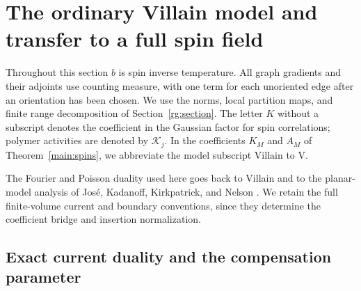 \section{The ordinary Villain model and transfer to a full spin field}
\label{vi:section}

Throughout this section $b$ is spin inverse temperature.  All graph
gradients and their adjoints use counting measure, with one term for each
unoriented edge after an orientation has been chosen.  We use the norms,
local partition maps, and finite range decomposition of
Section~\ref{rg:section}.  The letter $K$ without a subscript denotes the
coefficient in the Gaussian factor for spin correlations; polymer
activities are denoted by $\mathcal K_j$.
In the coefficients $K_M$ and $A_M$ of Theorem~\ref{main:spins}, we
abbreviate the model subscript $\mathrm{Villain}$ to $\mathrm V$.

The Fourier and Poisson duality used here goes back to Villain
and to the planar-model analysis of Jos\'e, Kadanoff, Kirkpatrick,
and Nelson \citep{Villain1975,JoseKadanoffKirkpatrickNelson1977}.
We retain the full finite-volume current and boundary conventions,
since they determine the coefficient bridge and insertion normalization.

\subsection{Exact current duality and the compensation parameter}

